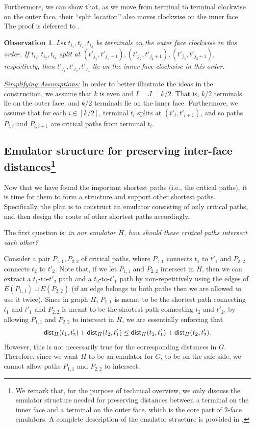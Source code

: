 \documentclass[11pt]{article}
\newtheorem{observation}[theorem]{Observation}
\newcommand{\dist}{\textnormal{\textsf{dist}}}
\begin{document}
Furthermore, we can show that, as we move from terminal to terminal clockwise on the outer face, their ``split location'' also moves clockwise on the inner face. The proof is deferred to .

\begin{observation}
\label{obs: split move}
Let $t_{i_1},t_{i_2},t_{i_3}$ be terminals on the outer face clockwise in this order. If $t_{i_1},t_{i_2},t_{i_3}$ split at $(t'_{j_1},t'_{j_1+1}),(t'_{j_2},t'_{j_2+1}),(t'_{j_3},t'_{j_3+1})$, respectively, then $t'_{j_1},t'_{j_2},t'_{j_3}$ lie on the inner face clockwise in this order.
\end{observation}

\underline{\emph{Simplifying Assumptions:}} In order to better illustrate the ideas in the construction,
we assume that  $k$ is even and $I=J=k/2$. That is, $k/2$ terminals lie on the outer face, and $k/2$ terminals lie on the inner face. Furthermore, we assume that for each $i\in [k/2]$, terminal $t_i$ splits at $(t'_i,t'_{i+1})$, and so paths $P_{i,i}$ and $P_{i,i+1}$ are critical paths from terminal $t_i$.

\subsection*{Emulator structure for preserving inter-face distances\footnote{We remark that, for the purpose of technical overview, we only discuss the emulator structure needed for preserving distances between a terminal on the inner face and a terminal on the outer face, which is the core part of $2$-face emulators. A complete description of the emulator structure is provided in .}}

Now that we have found the important shortest paths (i.e., the critical paths), it is time for them to form a structure and support other shortest paths. Specifically, the plan is to construct an emulator consisting of only critical paths, and then design the route of other shortest paths accordingly. 

The first question is: \emph{in our emulator $H$, how should these critical paths intersect each other?}

Consider a pair $P_{1,1},P_{2,2}$ of critical paths, where $P_{1,1}$ connects $t_1$ to $t'_1$ and $P_{2,2}$ connects $t_2$ to $t'_2$. Note that, if we let $P_{1,1}$ and $P_{2,2}$ intersect in $H$, then we can extract a $t_1$-to-$t'_2$ path and a $t_2$-to-$t'_1$ path by non-repetitively using the edges of $E(P_{1,1})\sqcup E(P_{2,2})$ (if an edge belongs to both paths then we are allowed to use it twice). Since in graph $H$, $P_{1,1}$ is meant to be the shortest path connecting $t_1$ and $t'_1$ and $P_{2,2}$ is meant to be the shortest path connecting $t_2$ and $t'_2$, by allowing $P_{1,1}$ and $P_{2,2}$ to intersect in $H$, we are essentially enforcing that
\[\dist_H(t_1,t'_2)+\dist_H(t_2,t'_1)\le \dist_H(t_1,t'_1)+\dist_H(t_2,t'_2).\]
However, this is not necessarily true for the corresponding distances in $G$. Therefore, since we want $H$ to be an emulator for $G$, to be on the safe side, we cannot allow paths $P_{1,1}$ and $P_{2,2}$ to intersect.
\end{document}
